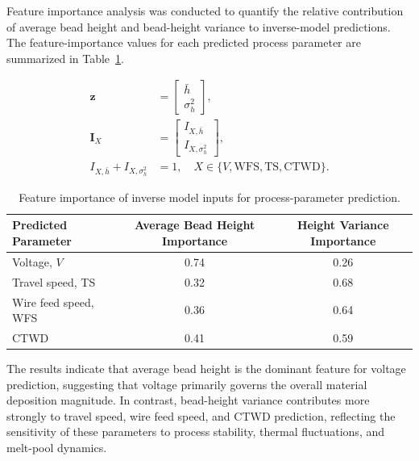 \documentclass[11pt]{article}
\begin{document}
Feature importance analysis was conducted to quantify the relative contribution of average bead height and bead-height variance to inverse-model predictions. The feature-importance values for each predicted process parameter are summarized in Table~\ref{tab:inverse_feature_importance}.

\begin{tcolorbox}[colback=white,colframe=black,boxrule=0.5pt,arc=2pt]
\begin{equation}
\begin{aligned}
\mathbf{z} &=
\begin{bmatrix}
\bar{h} \\
\sigma_h^2
\end{bmatrix}, \\
\mathbf{I}_{X} &=
\begin{bmatrix}
I_{X,\bar{h}} \\
I_{X,\sigma_h^2}
\end{bmatrix}, \\
I_{X,\bar{h}} + I_{X,\sigma_h^2} &= 1,
\quad
X \in \{V,\mathrm{WFS},\mathrm{TS},\mathrm{CTWD}\}.
\end{aligned}
\end{equation}
\end{tcolorbox}


\begin{table}[htbp]
\centering
\caption{Feature importance of inverse model inputs for process-parameter prediction.}
\label{tab:inverse_feature_importance}
\begin{tabular}{lcc}
\hline
Predicted Parameter & Average Bead Height Importance & Height Variance Importance \\
\hline
Voltage, $V$ & 0.74 & 0.26 \\
Travel speed, TS & 0.32 & 0.68 \\
Wire feed speed, WFS & 0.36 & 0.64 \\
CTWD & 0.41 & 0.59 \\
\hline
\end{tabular}
\end{table}


The results indicate that average bead height is the dominant feature for voltage prediction, suggesting that voltage primarily governs the overall material deposition magnitude. In contrast, bead-height variance contributes more strongly to travel speed, wire feed speed, and CTWD prediction, reflecting the sensitivity of these parameters to process stability, thermal fluctuations, and melt-pool dynamics.
\end{document}
